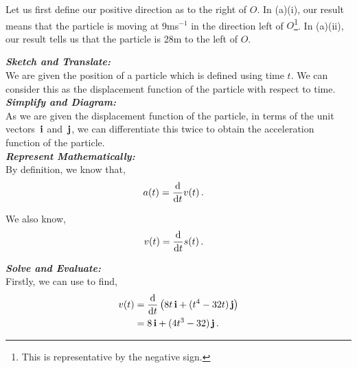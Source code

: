 \begin{subquestions}
\begin{subsubquestions}
\end{subsubquestions}


\subquestion

Let us first define our positive direction as to the right of $O$. In (a)(i), our result means that the particle is moving at 9ms$^{-1}$ in the direction left of $O$\footnote{This is representative by the negative sign.}. In (a)(ii), our result tells us that the particle is 28m to the left of $O$. \\


\subquestion

\begin{subsubquestions}
	
\subsubquestion

\textbf{\textit{Sketch and Translate:}} \\
We are given the position of a particle which is defined using time $t$. We can consider this as the displacement function of the particle with respect to time. \\




\textbf{\textit{Simplify and Diagram:}} \\
As we are given the displacement function of the particle, in terms of the unit vectors $\,\mathbf{i}$ and $\,\mathbf{j}$, we can differentiate this twice to obtain the acceleration function of the particle. \\



 
\textbf{\textit{Represent Mathematically:}} \\
By definition, we know that,
\begin{align}
	a(t) & = \frac{\mathrm{d}}{\mathrm{d}t}v(t) \label{2009:q6:AEqn2} \,.
\end{align}

We also know,
\begin{align}
	v(t) & = \frac{\mathrm{d}}{\mathrm{d}t}s(t) \label{2009:q6:VEqn2} \,.
\end{align}



\textbf{\textit{Solve and Evaluate:}} \\
Firstly, we can use  to find,
\begin{align}
	v(t) & = \frac{\mathrm{d}}{\mathrm{d}t}\left(8t\,\mathbf{i} + (t^4-32t)\,\mathbf{j}\right) \nonumber \\
	     & = 8\,\mathbf{i} + (4t^3-32)\,\mathbf{j} \,.
\end{align}


\end{subsubquestions}
\end{subquestions}
